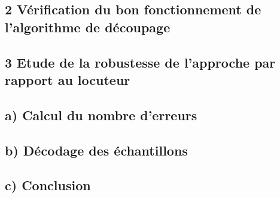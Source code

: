 \documentclass[a4paper,11pt]{article}
\begin{document}
\subsection*{2  Vérification du bon fonctionnement de l'algorithme de découpage}

\subsection*{3  Etude de la robustesse de l'approche par rapport au locuteur}

\subsection*{a) Calcul du nombre d'erreurs}

\subsection*{b) Décodage des échantillons}

\subsection*{c) Conclusion}
\end{document}

